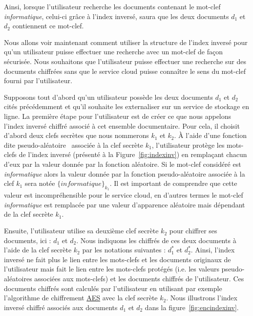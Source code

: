 \documentclass[french]{article}
\begin{document}
Ainsi, lorsque l'utilisateur recherche les documents contenant le
mot-clef \textit{informatique}, celui-ci grâce à l'index inversé,
saura que les deux documents $d_1$ et $d_2$ contiennent ce mot-clef.

Nous allons voir maintenant comment utiliser la structure de l'index
inversé pour qu'un utilisateur puisse effectuer une recherche avec un
mot-clef de façon sécurisée. Nous souhaitons que l'utilisateur puisse
effectuer une recherche sur des documents chiffrées sans que le
service cloud puisse connaître le sens du mot-clef fourni par
l'utilisateur.

Supposons tout d'abord qu'un utilisateur possède les deux documents
$d_1$ et $d_2$ cités précédemment et qu'il souhaite les externaliser
sur un service de stockage en ligne. La première étape pour
l'utilisateur est de créer ce que nous appelons l'index inversé
chiffré associé à cet ensemble documentaire. Pour cela, il choisit
d'abord deux clefs secrètes que nous nommerons $k_1$ et $k_2$. À
l'aide d'une fonction dite pseudo-aléatoire~\cite{GGM86} associée à la
clef secrète $k_1$, l'utilisateur protège les mots-clefs de l'index
inversé (présenté à la Figure~\ref{fig:indexinv}) en remplaçant chacun
d'eux par la valeur donnée par la fonction aléatoire. Si le mot-clef
considéré est \textit{informatique} alors la valeur donnée par la
fonction pseudo-aléatoire associée à la clef $k_1$ sera notée
$\{\mathit{informatique}\}_{k_1}$. Il est important de comprendre que
cette valeur est incompréhensible pour le service cloud, en d'autres
termes le mot-clef \textit{informatique} est remplacée par une valeur
d'apparence aléatoire mais dépendant de la clef secrète $k_1$.

Ensuite, l'utilisateur utilise sa deuxième clef secrète $k_2$ pour
chiffrer ses documents, ici : $d_1$ et $d_2$. Nous indiquons les
chiffrés de ces deux documents à l'aide de la clef secrète $k_2$ par
les notations suivantes : $d_1^*$ et $d_2^*$. Ainsi, l'index inversé
ne fait plus le lien entre les mots-clefs et les documents originaux
de l'utilisateur mais fait le lien entre les mots-clefs protégés
(i.e. les valeurs pseudo-aléatoires associées aux mots-clefs) et les
documents chiffrés de l'utilisateur. Ces documents chiffrés sont
calculés par l'utilisateur en utilisant par exemple l'algorithme de
chiffrement
\href{https://fr.wikipedia.org/wiki/Advanced_Encryption_Standard}{AES}
avec la clef secrète $k_2$. Nous illustrons l'index inversé chiffré
associés aux documents $d_1$ et $d_2$ dans la
figure~\ref{fig:encindexinv}.
\end{document}
